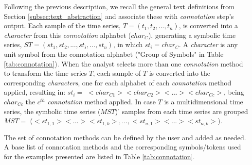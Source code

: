 Following the previous description, we recall the general text definitions from Section \ref{subsec:text_abstraction} and associate these with \textit{connotation} step's output. Each sample of the time series, $T=(t_1, t_2, ..., t_n)$,  is converted into a \textit{character} from this \textit{connotation} alphabet ($char_C$), generating a symbolic time series, $ST = (st_1, st_2, ..., st_i, ..., st_n)$, in which $st_i = char_C$. A \textit{character} is any unit symbol from the connotation alphabet ("Group of Symbols" in Table \ref{tab:connotation}). When the analyst selects more than one \textit{connotation} method to transform the time series $T$, each sample of $T$ is converted into the corresponding \textit{characters}, one for each alphabet of each \textit{connotation} method applied, resulting in: $st_i =$ $<char_{C1}><char_{C2}><...><char_{Cc}>$, being $ char_{Cc}$ the $c^{th}$ \textit{connotation} method applied. In case $T$ is a multidimensional time series, the symbolic time series ($MST$)' samples from each time series are grouped $MST =$ ($<st_{1,1}><...><st_{1,k}>,..., <st_{n,1}><...><st_{n,k}>$).

The set of connotation methods can be defined by the user and added as needed. A base list of connotation methods and the corresponding symbols/tokens used for the examples presented are listed in Table \ref{tab:connotation}.

